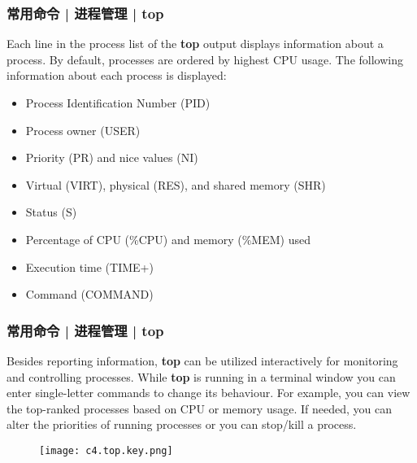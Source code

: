 \begin{frame}
  \frametitle{常用命令 | 进程管理 | top}
  Each line in the process list of the \textbf{top} output displays information about a process. By default, processes are ordered by highest CPU usage. The following information about each process is displayed: 
  \begin{itemize}
    \item Process Identification Number (PID)
    \item Process owner (USER)
    \item Priority (PR) and nice values (NI)
    \item Virtual (VIRT), physical (RES), and shared memory (SHR)
    \item Status (S)
    \item Percentage of CPU (\%CPU) and memory (\%MEM) used
    \item Execution time (TIME+)
    \item Command (COMMAND)
  \end{itemize}
\end{frame}

\begin{frame}
  \frametitle{常用命令 | 进程管理 | top}
  {\footnotesize
  Besides reporting information, \textbf{top} can be utilized interactively for monitoring and controlling processes. While \textbf{top} is running in a terminal window you can enter single-letter commands to change its behaviour. For example, you can view the top-ranked processes based on CPU or memory usage. If needed, you can alter the priorities of running processes or you can stop/kill a process.
  }
  \vspace{-0.2cm}
  \begin{figure}
    \centering
    \texttt{[image: c4.top.key.png]}
  \end{figure}
\end{frame}

